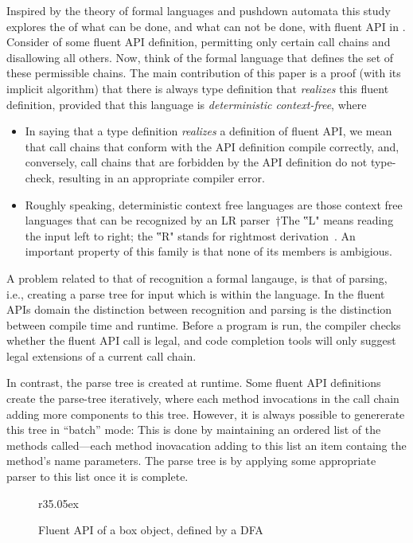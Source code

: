 Inspired by the theory of formal languages and pushdown automata
this study explores the of what can be done, and what can not be done, with fluent API in \Java.
Consider of some fluent API definition, permitting only certain call
chains and disallowing all others.
Now, think of the formal language that defines the set of these permissible chains.
The main contribution of this paper is a proof (with its implicit algorithm) that
there is always \Java type definition that \emph{realizes} this fluent definition, provided that this
language is \emph{deterministic context-free}, where
\begin{itemize}
  \item In saying that a type definition \emph{realizes} a definition of fluent
    API, we mean that call chains that conform with the API definition compile
    correctly, and, conversely, call chains that are forbidden by the API
    definition do not type-check, resulting in an appropriate compiler error.
  \item Roughly speaking, deterministic context free languages are those
    context free languages that can be recognized by an LR parser~†{The ‟L"
    means reading the input left to right; the ‟R" stands for rightmost derivation}~\cite{Aho:86}.
    An important property of this family is that none of its members is ambigious.
\end{itemize}

A problem related to that of recognition a formal langauge, 
  is that of parsing, i.e., creating a parse tree for input which is within the language. 
In the fluent APIs domain the distinction between recognition and parsing is 
  the distinction between compile time and runtime.
Before a program is run, the compiler checks whether the fluent API call is legal,
  and code completion tools will only suggest legal extensions of a current call chain.  

In contrast, the parse tree is created at runtime. 
Some fluent API definitions create the parse-tree 
  iteratively, where each method invocations in the call chain adding
  more components to this tree.
However, it is always possible to genererate this tree in ``batch'' mode:
This is done by maintaining an ordered list of the methods 
  called---each method inovacation adding to this list an item containg the method's name
  parameters.
The parse tree is by applying some appropriate parser to this list 
  once it is complete.


\begin{wrapfigure}[9]r{35.05ex}
\caption{\label{Figure:box}Fluent API of a box object, defined by a DFA}

  
\end{wrapfigure}

